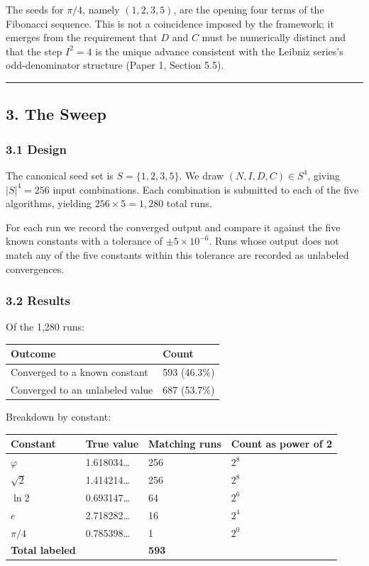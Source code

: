 \documentclass[
  11pt,
  letterpaper,
]{article}
\begin{document}
The seeds for \(\pi/4\), namely \((1, 2, 3, 5)\), are the opening four
terms of the Fibonacci sequence. This is not a coincidence imposed by
the framework; it emerges from the requirement that \(D\) and \(C\) must
be numerically distinct and that the step \(I^2 = 4\) is the unique
advance consistent with the Leibniz series's odd-denominator structure
(Paper 1, Section 5.5).

\begin{center}\rule{0.5\linewidth}{0.5pt}\end{center}

\subsection{3. The Sweep}\label{the-sweep}

\subsubsection{3.1 Design}\label{design}

The canonical seed set is \(S = \{1, 2, 3, 5\}\). We draw
\((N, I, D, C) \in S^4\), giving \(|S|^4 = 256\) input combinations.
Each combination is submitted to each of the five algorithms, yielding
\(256 \times 5 = 1{,}280\) total runs.

For each run we record the converged output and compare it against the
five known constants with a tolerance of \(\pm 5 \times 10^{-6}\). Runs
whose output does not match any of the five constants within this
tolerance are recorded as unlabeled convergences.

\subsubsection{3.2 Results}\label{results}

Of the 1,280 runs:

\begin{longtable}[]{@{}ll@{}}
\toprule\noalign{}
Outcome & Count \\
\midrule\noalign{}
\endhead
\bottomrule\noalign{}
\endlastfoot
Converged to a known constant & 593 (46.3\%) \\
Converged to an unlabeled value & 687 (53.7\%) \\
\end{longtable}

Breakdown by constant:

\begin{longtable}[]{@{}llll@{}}
\toprule\noalign{}
Constant & True value & Matching runs & Count as power of 2 \\
\midrule\noalign{}
\endhead
\bottomrule\noalign{}
\endlastfoot
\(\varphi\) & 1.618034\ldots{} & 256 & \(2^8\) \\
\(\sqrt{2}\) & 1.414214\ldots{} & 256 & \(2^8\) \\
\(\ln 2\) & 0.693147\ldots{} & 64 & \(2^6\) \\
\(e\) & 2.718282\ldots{} & 16 & \(2^4\) \\
\(\pi/4\) & 0.785398\ldots{} & 1 & \(2^0\) \\
\textbf{Total labeled} & & \textbf{593} & \\
\end{longtable}
\end{document}
